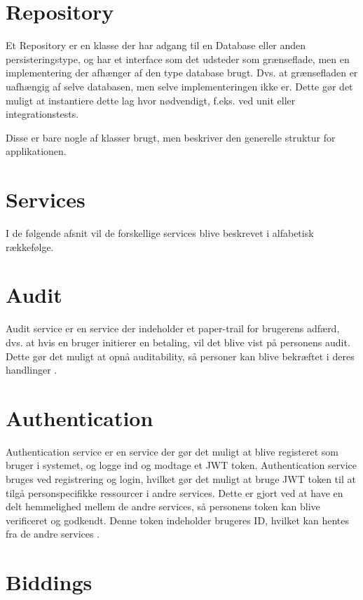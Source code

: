 \section{Repository}

Et Repository er en klasse der har adgang til en Database eller anden persisteringstype, og har et interface som det udsteder som grænseflade, men en implementering der afhænger af den type database brugt. Dvs. at grænsefladen er uafhængig af selve databasen, men selve implementeringen ikke er. Dette gør det muligt at instantiere dette lag hvor nødvendigt, f.eks. ved unit eller integrationstests.


Disse er bare nogle af klasser brugt, men beskriver den generelle struktur for applikationen.

\section{Services}

I de følgende afsnit vil de forskellige services blive beskrevet i alfabetisk rækkefølge.

\section{Audit}
\label{sec:audit-service}

Audit service er en service der indeholder et paper-trail for brugerens adfærd, dvs. at hvis en bruger initierer en betaling, vil det blive vist på personens audit. Dette gør det muligt at opnå auditability, så personer kan blive bekræftet i deres handlinger \cite[Audit-Service]{uml-diagrams}.

\section{Authentication}
\label{sec:authentication-service}

Authentication service er en service der gør det muligt at blive registeret som bruger i systemet, og logge ind og modtage et JWT token. Authentication service bruges ved registrering og login, hvilket gør det muligt at bruge JWT token til at tilgå personspecifikke ressourcer i andre services. Dette er gjort ved at have en delt hemmelighed mellem de andre services, så personens token kan blive verificeret og godkendt. Denne token indeholder brugeres ID, hvilket kan hentes fra de andre services \cite[Authentication-Service]{uml-diagrams}.

\section{Biddings}
\label{sec:biddings-service}

